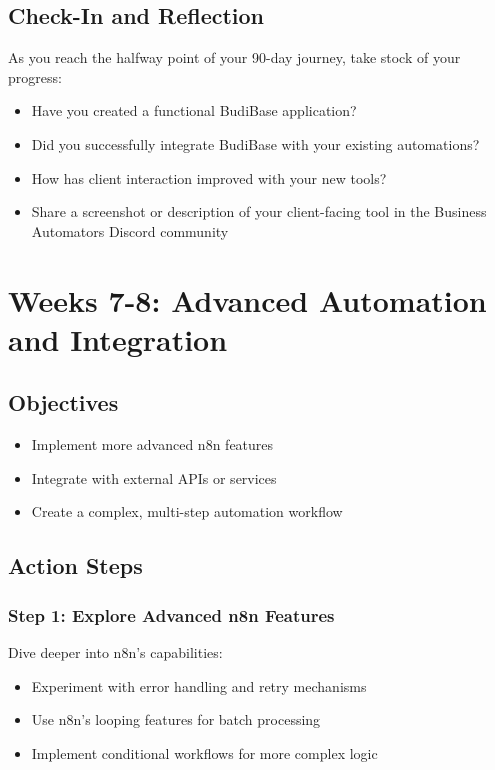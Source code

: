 \subsection{Check-In and Reflection}
As you reach the halfway point of your 90-day journey, take stock of your progress:

\begin{itemize}
    \item Have you created a functional BudiBase application?
    \item Did you successfully integrate BudiBase with your existing automations?
    \item How has client interaction improved with your new tools?
    \item Share a screenshot or description of your client-facing tool in the Business Automators Discord community
\end{itemize}

\section{Weeks 7-8: Advanced Automation and Integration}

\subsection{Objectives}
\begin{itemize}
    \item Implement more advanced n8n features
    \item Integrate with external APIs or services
    \item Create a complex, multi-step automation workflow
\end{itemize}

\subsection{Action Steps}

\subsubsection{Step 1: Explore Advanced n8n Features}
Dive deeper into n8n's capabilities:

\begin{itemize}
    \item Experiment with error handling and retry mechanisms
    \item Use n8n's looping features for batch processing
    \item Implement conditional workflows for more complex logic
\end{itemize}


